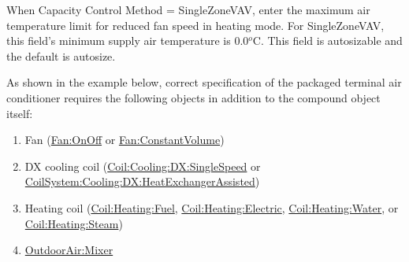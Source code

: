 When Capacity Control Method = SingleZoneVAV, enter the maximum air temperature limit for reduced fan speed in heating mode. For SingleZoneVAV, this field's minimum supply air temperature is 0.0\(^{o}\)\si{C}. This field is autosizable and the default is autosize.


As shown in the example below, correct specification of the packaged terminal air conditioner requires the following objects in addition to the compound object itself:

\begin{enumerate}
\def\labelenumi{\arabic{enumi})}
\item
  Fan (\hyperref[fanonoff]{Fan:OnOff} or \hyperref[fanconstantvolume]{Fan:ConstantVolume})
\item
  DX cooling coil (\hyperref[coilcoolingdxsinglespeed]{Coil:Cooling:DX:SingleSpeed} or \hyperref[coilsystemcoolingdxheatexchangerassisted]{CoilSystem:Cooling:DX:HeatExchangerAssisted})
\item
  Heating coil (\hyperref[coilheatinggas-000]{Coil:Heating:Fuel}, \hyperref[coilheatingelectric]{Coil:Heating:Electric}, \hyperref[coilheatingwater]{Coil:Heating:Water}, or \hyperref[coilheatingsteam]{Coil:Heating:Steam})
\item
  \hyperref[outdoorairmixer]{OutdoorAir:Mixer}
\end{enumerate}

